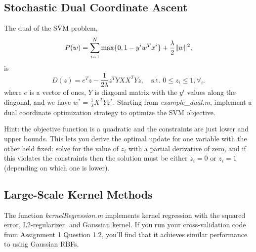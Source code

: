 \documentclass{article}
\begin{document}
\subsection{Stochastic Dual Coordinate Ascent}
The dual of the SVM problem,
\[
P(w) = \sum_{i=1}^N \max\{0,1-y^iw^Tx^i\} + \frac{\lambda}{2}\|w\|^2,
\]
is
\[
D(z) = e^Tz - \frac{1}{2\lambda}z^TYXX^TYz, \quad\text{s.t. } 0 \leq z_i \leq 1, \forall_i.
\]
where $e$ is a vector of ones, $Y$ is diagonal matrix with the $y^i$ values along the diagonal, and we have $w^* = \frac{1}{\lambda}X^TYz^*$. Starting from \emph{example\_dual.m}, implement a dual coordinate optimization  strategy to optimize the SVM objective. 

Hint: the objective function is a quadratic and the constraints are just lower and upper bounds. This lets you  derive the optimal update for one variable with the other held fixed: solve for the value of $z_i$ with a partial derivative of zero, and if this violates the constraints then the solution must be either $z_i = 0$ or $z_i = 1$ (depending on which one is lower).

\subsection{Large-Scale Kernel Methods}

The function \emph{kernelRegression.m} implements kernel regression with the squared error, L2-regularizer, and Gaussian kernel. If you run your cross-validation code from Assignment 1 Question 1.2, you'll find that it achieves similar performance to using Gaussian RBFs.
\end{document}

